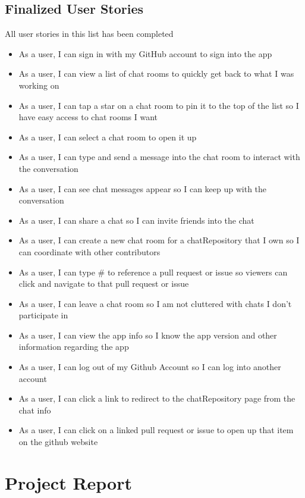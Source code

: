 \documentclass{report}
\begin{document}
\section{Finalized User Stories}
All user stories in this list has been completed
\begin{itemize}
    \item As a user, I can sign in with my GitHub account to sign into the app
    \item As a user, I can view a list of chat rooms to quickly get back to what I was working on
    \item As a user, I can tap a star on a chat room to pin it to the top of the list so I have easy access to chat rooms I want
    \item As a user, I can select a chat room to open it up
    \item As a user, I can type and send a message into the chat room to interact with the conversation
    \item As a user, I can see chat messages appear so I can keep up with the conversation
    \item As a user, I can share a chat so I can invite friends into the chat
    \item As a user, I can create a new chat room for a chatRepository that I own so I can coordinate with other contributors
    \item As a user, I can type \# to reference a pull request or issue so viewers can click and navigate to that pull request or issue
    \item As a user, I can leave a chat room so I am not cluttered with chats I don't participate in
    \item As a user, I can view the app info so I know the app version and other information regarding the app
    \item As a user, I can log out of my Github Account so I can log into another account
    \item As a user, I can click a link to redirect to the chatRepository page from the chat info
    \item As a user, I can click on a linked pull request or issue to open up that item on the github website

\end{itemize}

\chapter{Project Report}
\end{document}
